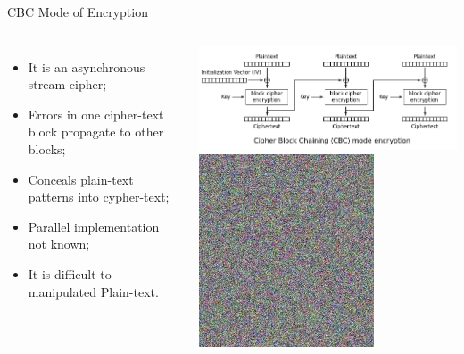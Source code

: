 \documentclass[12pt]{beamer}
\begin{document}
\begin{frame}{CBC Mode of Encryption}
\begin{columns}
\begin{itemize}
\item It is an asynchronous stream cipher;\pause
\item Errors in one cipher-text block propagate to other blocks;\pause
\item Conceals plain-text patterns into cypher-text;\pause
\item Parallel implementation not known;\pause
\item It is difficult to manipulated Plain-text.
\end{itemize}
\begin{center}
\includegraphics[scale=.25]{CBC_encryption.png}\pause\\
\includegraphics[scale=.35]{Tux_secure.jpg}
\end{center}
\end{columns}
\end{frame}
\end{document}
